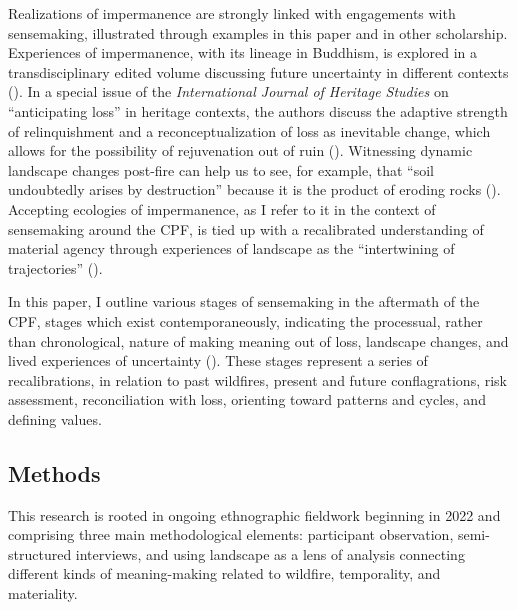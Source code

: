 \documentclass[
]{article}
\begin{document}
Realizations of impermanence are strongly linked with engagements with sensemaking, illustrated through examples in this paper and in other scholarship. Experiences of impermanence, with its lineage in Buddhism, is explored in a transdisciplinary edited volume discussing future uncertainty in different contexts (). In a special issue of the \emph{International Journal of Heritage Studies} on ``anticipating loss'' in heritage contexts, the authors discuss the adaptive strength of relinquishment and a reconceptualization of loss as inevitable change, which allows for the possibility of rejuvenation out of ruin (). Witnessing dynamic landscape changes post-fire can help us to see, for example, that ``soil undoubtedly arises by destruction'' because it is the product of eroding rocks (). Accepting ecologies of impermanence, as I refer to it in the context of sensemaking around the CPF, is tied up with a recalibrated understanding of material agency through experiences of landscape as the ``intertwining of trajectories'' ().

In this paper, I outline various stages of sensemaking in the aftermath of the CPF, stages which exist contemporaneously, indicating the processual, rather than chronological, nature of making meaning out of loss, landscape changes, and lived experiences of uncertainty (). These stages represent a series of recalibrations, in relation to past wildfires, present and future conflagrations, risk assessment, reconciliation with loss, orienting toward patterns and cycles, and defining values.

\subsection{Methods}\label{methods-2}

This research is rooted in ongoing ethnographic fieldwork beginning in 2022 and comprising three main methodological elements: participant observation, semi-structured interviews, and using landscape as a lens of analysis connecting different kinds of meaning-making related to wildfire, temporality, and materiality.
\end{document}
